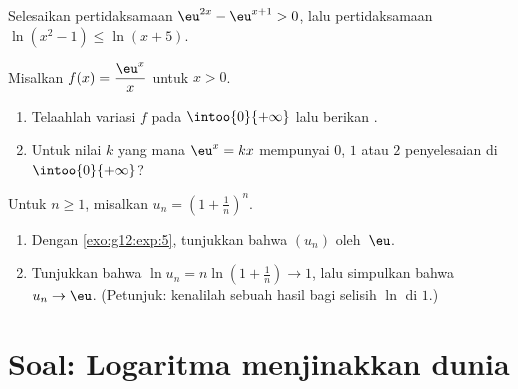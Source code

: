 \begin{exercise}[$\star\star$]\label{exo:g12:exp:7}
Selesaikan pertidaksamaan $\eu^{2x} - \eu^{x+1} > 0$, lalu pertidaksamaan
$\ln(x^2 - 1) \leq \ln(x + 5)$.
\end{exercise}

\begin{exercise}[$\star\star\star$]\label{exo:g12:exp:8}
Misalkan $f(x) = \dfrac{\eu^x}{x}$ untuk $x > 0$.
\begin{enumerate}
  \item Telaahlah variasi $f$ pada $\intoo{0}{+\infty}$ lalu berikan
        .
  \item Untuk nilai $k$ yang mana  $\eu^x = kx$ mempunyai $0$, $1$
        atau $2$ penyelesaian di $\intoo{0}{+\infty}$?
\end{enumerate}
\end{exercise}

\begin{exercise}[$\star\star\star$]\label{exo:g12:exp:9}
Untuk $n \geq 1$, misalkan $u_n = \left(1 + \frac1n\right)^n$.
\begin{enumerate}
  \item Dengan \cref{exo:g12:exp:5}, tunjukkan bahwa $(u_n)$ 
        oleh~$\eu$.
  \item Tunjukkan bahwa $\ln u_n = n \ln\left(1 + \frac1n\right) \to 1$, lalu
        simpulkan bahwa $u_n \to \eu$.
        (Petunjuk: kenalilah sebuah hasil bagi selisih $\ln$ di $1$.)
\end{enumerate}
\end{exercise}

\section{Soal: Logaritma menjinakkan dunia}

